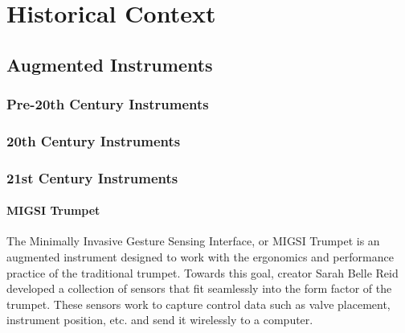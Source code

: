 

\chapter{Historical Context}
\section{Augmented Instruments}

\subsection{Pre-20th Century Instruments}

\subsection{20th Century Instruments}


\subsection{21st Century Instruments}
\subsubsection{MIGSI Trumpet}
The Minimally Invasive Gesture Sensing Interface, or MIGSI Trumpet is an augmented instrument designed to work with the ergonomics and performance practice of the traditional trumpet\cite{reid2016}. Towards this goal, creator Sarah Belle Reid developed a collection of sensors that fit seamlessly into the form factor of the trumpet. These sensors work to capture control data such as valve placement, instrument position, etc. and send it wirelessly to a computer.

